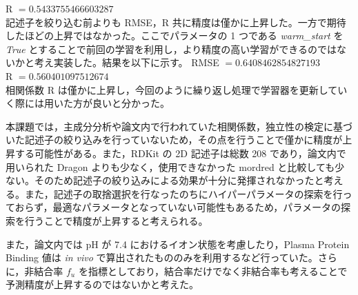 \documentclass[a4j,11pt]{jarticle}
\begin{document}
R $= 0.5433755466603287$ \\
\linebreak
記述子を絞り込む前よりも RMSE，R 共に精度は僅かに上昇した。一方で期待したほどの上昇ではなかった。ここでパラメータの 1 つである \textit{warm\_start} を \textit{True} とすることで前回の学習を利用し，より精度の高い学習ができるのではないかと考え実装した。結果を以下に示す。
\linebreak
RMSE $= 0.6408462854827193$\\
R $= 0.560401097512674$ \\
\linebreak
相関係数 R は僅かに上昇し，今回のように繰り返し処理で学習器を更新していく際には用いた方が良いと分かった。\par
本課題では，主成分分析や論文内で行われていた相関係数，独立性の検定に基づいた記述子の絞り込みを行っていないため，その点を行うことで僅かに精度が上昇する可能性がある。また，RDKit の 2D 記述子は総数 208 であり，論文内で用いられた Dragon よりも少なく，使用できなかった mordred と比較しても少ない。そのため記述子の絞り込みによる効果が十分に発揮されなかったと考える。また，記述子の取捨選択を行なったのちにハイパーパラメータの探索を行っておらず，最適なパラメータとなっていない可能性もあるため，パラメータの探索を行うことで精度が上昇すると考えられる。\par
また，論文内では pH が 7.4 におけるイオン状態を考慮したり，Plasma Protein Binding 値は \textit{in vivo} で算出されたもののみを利用するなど行っていた。さらに，非結合率 $f_u$ を指標としており，結合率だけでなく非結合率も考えることで予測精度が上昇するのではないかと考えた。
\end{document}
